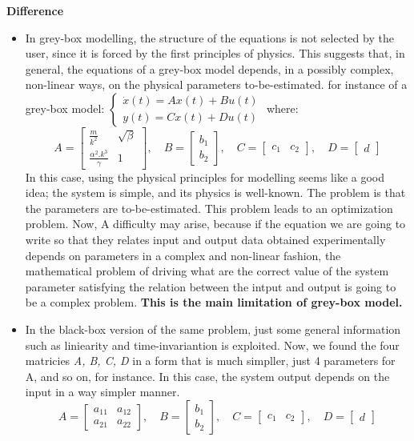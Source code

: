\textbf{Difference} 
\begin{itemize}
\item In grey-box modelling, the structure of the equations is not selected by the user, since it is forced by the first principles of physics. This suggests that, in general, the equations of a grey-box model depends, in a possibly complex, non-linear ways, on the physical parameters to-be-estimated.\newline
for instance of a grey-box model:
$\begin{cases}
    \dot{x}(t) = A x(t) + B u(t) \\
    y(t) = C x(t) + D u(t)
\end{cases}$ where:
\newline
\[
A = \begin{bmatrix}
\frac{m}{k^2} & \sqrt{\beta}\\
\frac{\alpha^2.k^3}{\gamma} & 1  
\end{bmatrix}, \quad
B = \begin{bmatrix}
b_1 \\
b_2
\end{bmatrix}, \quad
C = \begin{bmatrix}
c_1 & c_2
\end{bmatrix}, \quad
D = \begin{bmatrix}
d
\end{bmatrix}
\]
In this case, using the physical principles for modelling seems like a good idea; the system is simple, and its physics is well-known. The problem is that the parameters are to-be-estimated. This problem leads to an optimization problem. Now, A difficulty may arise, because if the equation we are going to write so that they relates input and output data obtained experimentally depends on parameters in a complex and non-linear fashion, the mathematical problem of driving what are the correct value of the system parameter satisfying the relation between the intput and output is going to be a complex problem. \textbf{This is the main limitation of grey-box model.}

\item In the black-box version of the same problem, just some general information such as liniearity and time-invariantion is exploited. Now, we found the four matricies \textit{A, B, C, D} in a form that is much simpller, just 4 parameters for A, and so on, for instance. In this case, the system output depends on the input in a way simpler manner.
\[
A = \begin{bmatrix}
a_{11} & a_{12} \\
a_{21} & a_{22}  
\end{bmatrix}, \quad
B = \begin{bmatrix} 
b_1 \\
b_2
\end{bmatrix}, \quad
C = \begin{bmatrix}
c_1 & c_2
\end{bmatrix}, \quad
D = \begin{bmatrix}
d
\end{bmatrix}
\]\newline



\end{itemize}

